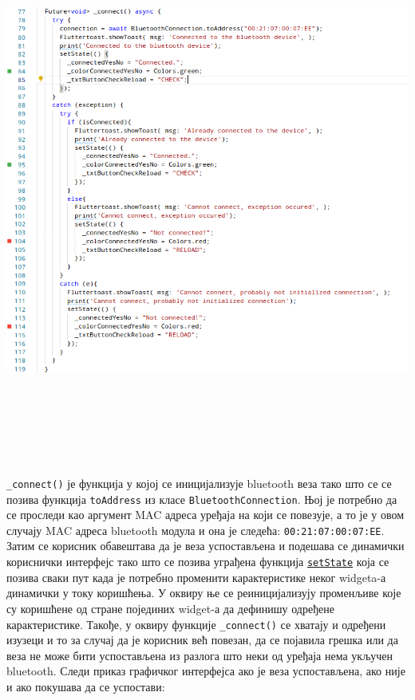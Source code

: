 \documentclass[12pt]{article}
\begin{document}
\vspace{0.3cm}
\begin{center}
    \centering 
    \includegraphics[height=18cm, width=16.5cm]{images/dart5}
\end{center}
\indent{} \texttt{\_connect()} је функција у којој се иницијализује bluetooth веза тако што се се позива функција \texttt{toAddress} из класе \texttt{BluetoothConnection}. Њој је потребно да се проследи као аргумент MAC адреса уређаја на који се повезује, а то је у овом случају MAC адреса bluetooth модула и она је следећа: \texttt{00:21:07:00:07:EE}. Затим се корисник обавештава да је веза успостављена и подешава се динамички кориснички интерфејс тако што се позива уграђена функција \href{https://api.flutter.dev/flutter/widgets/State/setState.html}{\texttt{setState}} која се позива сваки пут када је потребно променити карактеристике неког widgeta-а динамички у току коришћења. У оквиру ње се реиницијализују променљиве које су коришћене од стране појединих widget-а да дефинишу одређене карактеристике. Такође, у оквиру функције \texttt{\_connect()} се хватају и одређени изузеци и то за случај да је корисник већ повезан, да се појавила грешка или да веза не може бити успостављена из разлога што неки од уређаја нема укључен bluetooth. Следи приказ графичког интерфејса ако је веза успостављена, ако није и ако покушава да се успостави:
\end{document}
